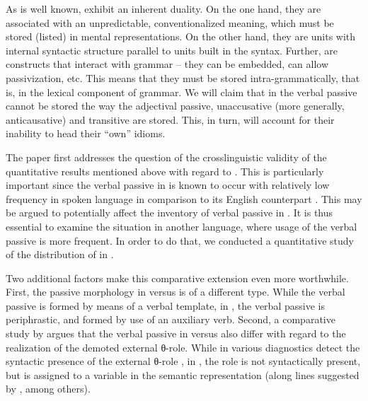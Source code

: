 \documentclass[output=paper]{langsci/langscibook}
\begin{document}
As is well known,  exhibit an inherent duality. On the one hand, they are
associated with an unpredictable, conventionalized meaning, which must be
stored (listed) in mental representations. On the other hand, they are units
with internal syntactic structure parallel to units built in the syntax.
Further,  are constructs that interact with grammar – they can be
embedded, can allow passivization, etc. This means that they must be stored
intra-grammatically, that is, in the lexical component of grammar. We will
claim that  in the verbal passive cannot be stored the way the adjectival
passive, unaccusative (more generally, anticausative) and transitive  are
stored. This, in turn, will account for their inability to head their \enquote{own}
idioms.

The paper first addresses the question of the crosslinguistic validity of the
quantitative results mentioned above with regard to . This is
particularly important since the verbal passive in  is known to
occur with relatively low frequency in spoken language in comparison to its
English counterpart \citep{Berman2008}. This may be argued to potentially
affect the inventory of verbal passive  in . It is thus
essential to examine the situation in another language, where usage of the
verbal passive is more frequent. In order to do that, we conducted a
quantitative study of the distribution of  in .

Two additional factors make this comparative extension even more worthwhile.
First, the passive morphology in  versus  is of a different
type.  While the  verbal passive is formed by means of a verbal
template, in , the verbal passive is periphrastic, and formed by use of
an auxiliary verb. Second, a comparative study by \citet{Meltzer-Asscher2012}
argues that the verbal passive in  versus  also differ with
regard to the realization of the demoted external θ-role. While in 
various diagnostics detect the syntactic presence of the external θ-role
\parencite[e.g.][]{Jaeggli1986,BakJohRob1989,Collins2005}, in , the
role is not syntactically present, but is assigned to a variable in the
semantic representation (along lines suggested by
\citealt{Chierchia2004,Reinhart2002,HorSil2009}, among others).
\end{document}
